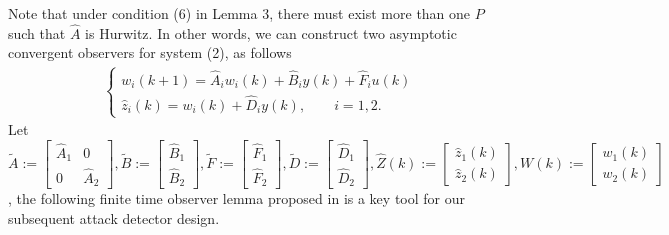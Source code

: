\documentclass[english]{cccconf}
\theoremstyle{definition}
\begin{document}
Note that under condition (6) in Lemma 3, there must exist more than one $P$ such that $\hat{A}$ is Hurwitz. In other words, we can construct two asymptotic convergent observers for system (2), as follows
\begin{equation}\begin{split}\begin{cases}
w_i(k+1)=\hat{A}_iw_i(k)+\hat{B}_iy(k)+\hat{F}_iu(k)\\
\hat{z}_i(k)=w_i(k)+\hat{D}_iy(k),  \qquad i=1, 2.
\end{cases}\end{split}\end{equation}
Let $\tilde{A}:=\begin{bmatrix}
\hat{A}_1&0\\0&\hat{A}_2
\end{bmatrix},\tilde{B}:=\begin{bmatrix}
\hat{B}_1\\\hat{B}_2
\end{bmatrix},\tilde{F}:=\begin{bmatrix}
\hat{F}_1\\\hat{F}_2
\end{bmatrix},\tilde{D}:=\begin{bmatrix}
\hat{D}_1\\\hat{D}_2
\end{bmatrix},\hat{Z}(k):=\begin{bmatrix}
\hat{z}_1(k)\\\hat{z}_2(k)
\end{bmatrix},W(k):=\begin{bmatrix}
w_1(k)\\w_2(k)
\end{bmatrix}$, the following finite time observer lemma proposed in \citep{5573041} is a key tool for our subsequent attack detector design.
\end{document}
